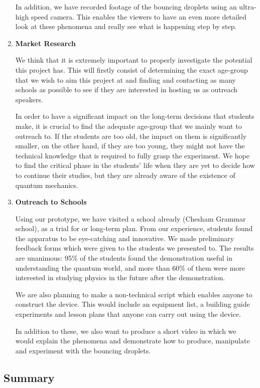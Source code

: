 \begin{enumerate}
In addition, we have recorded footage of the bouncing droplets using an ultra-high speed camera. This enables the viewers to have an even more detailed look at these phenomena and really see what is happening step by step.


\item \textbf{Market Research}

We think that it is extremely important to properly investigate the potential this project has. This will firstly consist of determining the exact age-group that we wish to aim this project at and finding and contacting as many schools as possible to see if they are interested in hosting us as outreach speakers.

In order to have a significant impact on the long-term decisions that students make, it is crucial to find the adequate age-group that we mainly want to outreach to. If the students are too old, the impact on them is significantly smaller, on the other hand, if they are too young, they might not have the technical knowledge that is required to fully grasp the experiment. We hope to find the critical phase in the students' life when they are yet to decide how to continue their studies, but they are already aware of the existence of quantum mechanics.


\item \textbf{Outreach to Schools}

Using our prototype, we have visited a school already (Chesham Grammar school), as a trial for or long-term plan. From our experience, students found the apparatus to be eye-catching and innovative. We made preliminary feedback forms which were given to the students we presented to. The results are unanimous: 95\% of the students found the demonstration useful in understanding the quantum world, and more than 60\% of them were more interested in studying physics in the future after the demonstration. 

We are also planning to make a non-technical script which enables anyone to construct the device. This would include an equipment list, a building guide experiments and lesson plans that anyone can carry out using the device.

In addition to these, we also want to produce a short video in which we would explain the phenomena and demonstrate how to produce, manipulate and experiment with the bouncing droplets. \ 

\end{enumerate}

\subsection{Summary}

